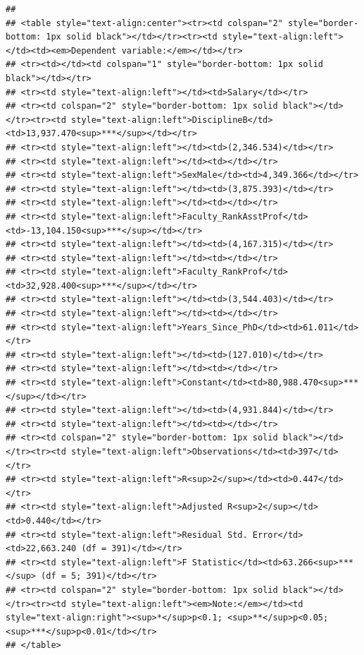 \documentclass[]{article}
\begin{document}
\begin{verbatim}
## 
## <table style="text-align:center"><tr><td colspan="2" style="border-bottom: 1px solid black"></td></tr><tr><td style="text-align:left"></td><td><em>Dependent variable:</em></td></tr>
## <tr><td></td><td colspan="1" style="border-bottom: 1px solid black"></td></tr>
## <tr><td style="text-align:left"></td><td>Salary</td></tr>
## <tr><td colspan="2" style="border-bottom: 1px solid black"></td></tr><tr><td style="text-align:left">DisciplineB</td><td>13,937.470<sup>***</sup></td></tr>
## <tr><td style="text-align:left"></td><td>(2,346.534)</td></tr>
## <tr><td style="text-align:left"></td><td></td></tr>
## <tr><td style="text-align:left">SexMale</td><td>4,349.366</td></tr>
## <tr><td style="text-align:left"></td><td>(3,875.393)</td></tr>
## <tr><td style="text-align:left"></td><td></td></tr>
## <tr><td style="text-align:left">Faculty_RankAsstProf</td><td>-13,104.150<sup>***</sup></td></tr>
## <tr><td style="text-align:left"></td><td>(4,167.315)</td></tr>
## <tr><td style="text-align:left"></td><td></td></tr>
## <tr><td style="text-align:left">Faculty_RankProf</td><td>32,928.400<sup>***</sup></td></tr>
## <tr><td style="text-align:left"></td><td>(3,544.403)</td></tr>
## <tr><td style="text-align:left"></td><td></td></tr>
## <tr><td style="text-align:left">Years_Since_PhD</td><td>61.011</td></tr>
## <tr><td style="text-align:left"></td><td>(127.010)</td></tr>
## <tr><td style="text-align:left"></td><td></td></tr>
## <tr><td style="text-align:left">Constant</td><td>80,988.470<sup>***</sup></td></tr>
## <tr><td style="text-align:left"></td><td>(4,931.844)</td></tr>
## <tr><td style="text-align:left"></td><td></td></tr>
## <tr><td colspan="2" style="border-bottom: 1px solid black"></td></tr><tr><td style="text-align:left">Observations</td><td>397</td></tr>
## <tr><td style="text-align:left">R<sup>2</sup></td><td>0.447</td></tr>
## <tr><td style="text-align:left">Adjusted R<sup>2</sup></td><td>0.440</td></tr>
## <tr><td style="text-align:left">Residual Std. Error</td><td>22,663.240 (df = 391)</td></tr>
## <tr><td style="text-align:left">F Statistic</td><td>63.266<sup>***</sup> (df = 5; 391)</td></tr>
## <tr><td colspan="2" style="border-bottom: 1px solid black"></td></tr><tr><td style="text-align:left"><em>Note:</em></td><td style="text-align:right"><sup>*</sup>p<0.1; <sup>**</sup>p<0.05; <sup>***</sup>p<0.01</td></tr>
## </table>
\end{verbatim}
\end{document}
